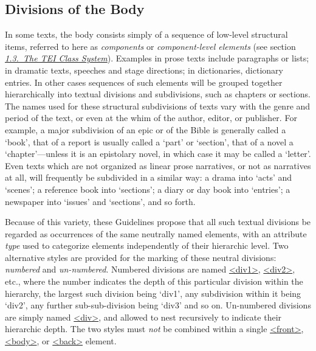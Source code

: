 \subsection[{Divisions of the Body}]{Divisions of the Body}\label{DSDIV}\par
In some texts, the body consists simply of a sequence of low-level structural items, referred to here as \textit{components} or \textit{component-level elements} (see section \textit{\hyperref[STEC]{1.3.\ The TEI Class System}}). Examples in prose texts include paragraphs or lists; in dramatic texts, speeches and stage directions; in dictionaries, dictionary entries. In other cases sequences of such elements will be grouped together hierarchically into textual divisions and subdivisions, such as chapters or sections. The names used for these structural subdivisions of texts vary with the genre and period of the text, or even at the whim of the author, editor, or publisher. For example, a major subdivision of an epic or of the Bible is generally called a ‘book’, that of a report is usually called a ‘part’ or ‘section’, that of a novel a ‘chapter’—unless it is an epistolary novel, in which case it may be called a ‘letter’. Even texts which are not organized as linear prose narratives, or not as narratives at all, will frequently be subdivided in a similar way: a drama into ‘acts’ and ‘scenes’; a reference book into ‘sections’; a diary or day book into ‘entries’; a newspaper into ‘issues’ and ‘sections’, and so forth.\par
Because of this variety, these Guidelines propose that all such textual divisions be regarded as occurrences of the same neutrally named elements, with an attribute {\itshape type} used to categorize elements independently of their hierarchic level. Two alternative styles are provided for the marking of these neutral divisions: \textit{numbered} and \textit{un-numbered}. Numbered divisions are named \hyperref[TEI.div1]{<div1>}, \hyperref[TEI.div2]{<div2>}, etc., where the number indicates the depth of this particular division within the hierarchy, the largest such division being ‘div1’, any subdivision within it being ‘div2’, any further sub-sub-division being ‘div3’ and so on. Un-numbered divisions are simply named \hyperref[TEI.div]{<div>}, and allowed to nest recursively to indicate their hierarchic depth. The two styles must \textit{not} be combined within a single \hyperref[TEI.front]{<front>}, \hyperref[TEI.body]{<body>}, or \hyperref[TEI.back]{<back>} element.
